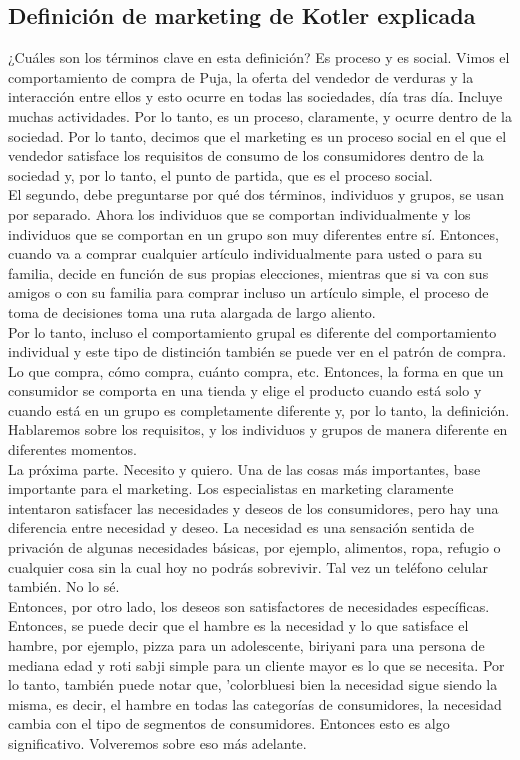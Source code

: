 \documentclass[10pt]{book}
\begin{document}
\subsection{Definición de marketing de Kotler explicada}
¿Cuáles son los términos clave en esta definición?  {\color{blue}Es proceso y es social}. Vimos el comportamiento de compra de Puja, la oferta del vendedor de verduras y la interacción entre ellos y esto ocurre en todas las sociedades, día tras día. Incluye muchas actividades. Por lo tanto, es un proceso, claramente, y ocurre dentro de la sociedad. Por lo tanto, decimos que el marketing es un proceso social en el que el vendedor satisface los requisitos de consumo de los consumidores dentro de la sociedad y, por lo tanto, el punto de partida, que es el proceso social.\\
El segundo, debe preguntarse por qué dos términos, individuos y grupos, se usan por separado. Ahora los individuos que se comportan individualmente y los individuos que se comportan en un grupo son muy diferentes entre sí. Entonces, cuando va a comprar cualquier artículo individualmente para usted o para su familia, decide en función de sus propias elecciones, mientras que si va con sus amigos o con su familia para comprar incluso un artículo simple, el proceso de toma de decisiones toma una ruta alargada de largo aliento.\\
Por lo tanto, incluso el comportamiento grupal es diferente del comportamiento individual y este tipo de distinción también se puede ver en el patrón de compra. Lo que compra, cómo compra, cuánto compra, etc. Entonces, {\color{blue}la forma en que un consumidor se comporta en una tienda y elige el producto cuando está solo y cuando está en un grupo es completamente diferente} y, por lo tanto, la definición. Hablaremos sobre los requisitos, y los individuos y grupos de manera diferente en diferentes momentos.\\
La próxima parte. Necesito y quiero. Una de las cosas más importantes, base importante para el marketing. Los especialistas en marketing claramente intentaron satisfacer las necesidades y deseos de los consumidores, pero hay una diferencia entre necesidad y deseo. {\color{blue}La necesidad es una sensación sentida de privación de algunas necesidades básicas, por ejemplo, alimentos, ropa, refugio o cualquier cosa sin la cual hoy no podrás sobrevivir. Tal vez un teléfono celular también. No lo sé.}\\
Entonces, por otro lado, los deseos son satisfactores de necesidades específicas. Entonces, se puede decir que el hambre es la necesidad y lo que satisface el hambre, por ejemplo, pizza para un adolescente, biriyani para una persona de mediana edad y roti sabji simple para un cliente mayor es lo que se necesita. Por lo tanto, también puede notar que, {'color{blue}si bien la necesidad sigue siendo la misma, es decir, el hambre en todas las categorías de consumidores, la necesidad cambia con el tipo de segmentos de consumidores.} Entonces esto es algo significativo. Volveremos sobre eso más adelante.\\
\end{document}
